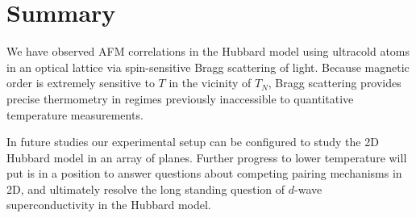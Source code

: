  

\section{Summary} 

We have observed AFM correlations in the Hubbard model using ultracold atoms in
an optical lattice via spin-sensitive Bragg scattering of light.  Because
magnetic order is extremely sensitive to $T$ in the vicinity of $T_{N}$,  Bragg
scattering provides precise thermometry in regimes previously inaccessible to
quantitative temperature measurements.  

In future studies our experimental setup can be configured to study the 2D
Hubbard model in an array of planes.  Further progress to lower temperature
will put is in a position to answer questions about competing pairing
mechanisms in 2D, and ultimately resolve the long standing question of $d$-wave
superconductivity in the Hubbard model.









